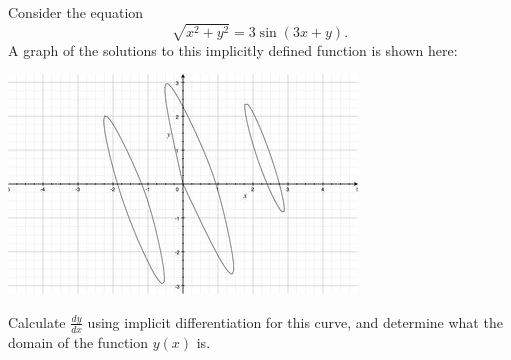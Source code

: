 \documentclass{ximera}
\author{Emma Smith Zbarsky}
\begin{document}
\begin{exercise}

Consider the equation \[\sqrt{x^2+y^2} = 3\sin(3x+y).\] A graph of the
solutions to this implicitly defined function is shown here:


\begin{image}\includegraphics[width=.5\textwidth]{implicitcurve.jpg}\end{image}



Calculate $\frac{dy}{dx}$ using implicit differentiation for this curve,
and determine what the domain of the function $y(x)$ is.


\begin{multipleChoice}
\end{multipleChoice}

\end{exercise}
\end{document}
